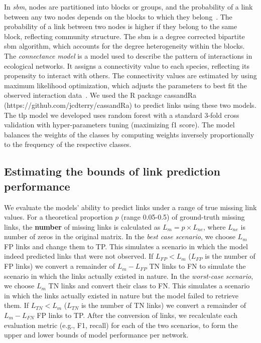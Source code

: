 \documentclass[oneside, a4paper, onecolumn, 11pt]{article}
\begin{document}
\begin{refsection}
In \textit{\ac{sbm}}, nodes are partitioned into blocks or groups, and the probability of a link between any two nodes depends on the blocks to which they belong~\autocite{Holland1983-fe}. The probability of a link between two nodes is higher if they belong to the same block, reflecting community structure. The \acl{sbm} is a degree corrected bipartite \ac{sbm} algorithm, which accounts for the degree heterogeneity within the blocks. The \textit{connectance model} is a model used to describe the pattern of interactions in ecological networks. It assigns a connectivity value to each species, reflecting its propensity to interact with others. The connectivity values are estimated by using maximum likelihood optimization, which adjusts the parameters to best fit the observed interaction data~\autocite{Terry2020-wv}. We used the R package cassandRa (https://github.com/jcdterry/cassandRa) to predict links using these two models. The \ac{tlp} model we developed uses random forest with a standard 3-fold cross validation with hyper-parameters tuning (maximizing f1 score). The model balances the weights of the classes by computing weights inversely proportionally to the frequency of the respective classes.

\subsection*{Estimating the bounds of link prediction performance}
We evaluate the models' ability to predict links under a range of true missing link values. For a theoretical proportion $p$ (range 0.05-0.5) of ground-truth missing links, the \textbf{number} of missing links is calculated as $L_m=p\times L_{ne}$, where $L_{ne}$ is number of zeros in the original matrix. In the \textit{best case scenario}, we choose $L_m$ FP links and change them to TP. This simulates a scenario in which the model indeed predicted links that were not observed. If $L_{FP}<L_m$ ($L_{FP}$ is the number of FP links) we convert a remainder of $L_m-L_{FP}$ TN links to FN to simulate the scenario in which the links actually existed in nature. In the \textit{worst-case scenario}, we choose $L_m$ TN links and convert their class to FN. This simulates a scenario in which the links actually existed in nature but the model failed to retrieve them. If $L_{TN}<L_m$ ($L_{TN}$ is the number of TN links) we convert a remainder of $L_m-L_{FN}$ FP links to TP. After the conversion of links, we recalculate each evaluation metric (e.g., F1, recall) for each of the two scenarios, to form the upper and lower bounds of model performance per network. 


\end{refsection}
\end{document}

